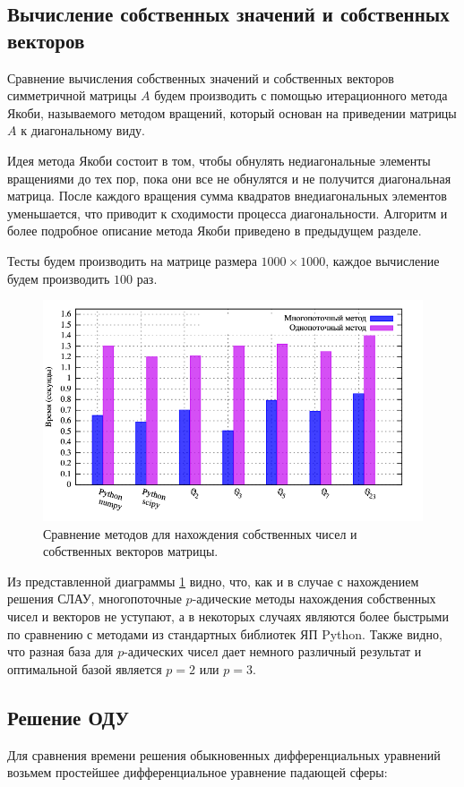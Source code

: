 \documentclass[master, och, times, pract]{sty/SCWorks}
\theoremstyle{plain}
\theoremstyle{definition}
\numberwithin{equation}{section}
\begin{document}
\subsection{Вычисление собственных значений и собственных векторов}
Сравнение вычисления собственных значений и собственных векторов симметричной матрицы $A$ будем производить с помощью итерационного метода Якоби, называемого методом вращений, который основан на приведении матрицы $A$ к диагональному виду.

Идея метода Якоби состоит в том, чтобы обнулять недиагональные элементы вращениями до тех пор, пока они все не обнулятся и не получится диагональная матрица. После каждого вращения сумма квадратов внедиагональных элементов уменьшается, что приводит к сходимости процесса диагональности. Алгоритм и более подробное описание метода Якоби приведено в предыдущем разделе.

Тесты будем производить на матрице размера $1000 \times 1000$, каждое вычисление будем производить $100$ раз.

\begin{figure}[H]
\centerline{\includegraphics[width=0.85\linewidth]{../gnuplot/multi/jacoby/plot.png}}
\caption{Сравнение методов для нахождения собственных чисел и собственных векторов матрицы.}
\label{img:multi:jacoby}
\end{figure}

Из представленной диаграммы \ref{img:multi:jacoby} видно, что, как и в случае с нахождением решения СЛАУ, многопоточные $p$-адические методы нахождения собственных чисел и векторов не уступают, а в некоторых случаях являются более быстрыми по сравнению с методами из стандартных библиотек ЯП Python. Также видно, что разная база для $p$-адических чисел дает немного различный результат и оптимальной базой является $p=2$ или $p=3$.

\subsection{Решение ОДУ}
Для сравнения времени решения обыкновенных дифференциальных уравнений возьмем простейшее дифференциальное уравнение падающей \mbox{сферы:}
\end{document}
